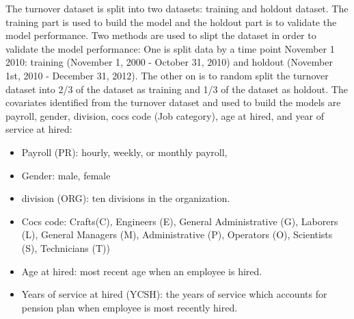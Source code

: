 \documentclass[12pt,letterpaper]{article}
\begin{document}
The turnover dataset is split into two datasets: training and holdout dataset. The training part is used to build the model  and the holdout part is to validate the model performance. Two methods are used to slipt the dataset in order to validate the model performance: One is split data by a time point November 1 2010: training (November 1, 2000 - October 31, 2010) and holdout (November 1st, 2010 - December 31, 2012). The other on is to random split the turnover dataset into 2/3 of the dataset as training and 1/3 of the dataset as holdout. %
The covariates identified from the turnover dataset and used to build the models are payroll, gender, division, cocs code (Job category), age at hired, and year of service at hired:
\begin{itemize}
	\item Payroll (PR): hourly, weekly, or monthly payroll,
	\item Gender: male, female
	\item division (ORG): ten divisions in the organization.
	\item Cocs code: Crafts(C), Engineers (E), General Administrative (G), Laborers (L), General Managers (M),  Administrative (P),  Operators (O), Scientists (S), Technicians (T))
	\item Age at hired: most recent age when an employee is hired.
	\item Years of service at hired (YCSH): the years of service which accounts for pension plan when employee is most recently hired.
	
\end{itemize}
\end{document}
